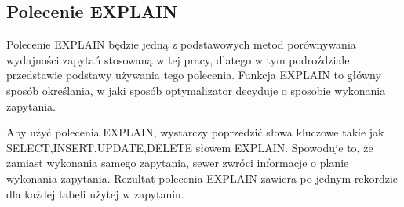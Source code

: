 \subsection{Polecenie EXPLAIN}
Polecenie EXPLAIN będzie jedną z podstawowych metod porównywania wydajności zapytań stosowaną w tej pracy, dlatego w tym podroździale przedstawie podstawy używania tego polecenia. Funkcja EXPLAIN to główny sposób określania, w jaki sposób optymalizator decyduje o sposobie wykonania zapytania.

Aby użyć polecenia EXPLAIN, wystarczy poprzedzić słowa kluczowe takie jak SELECT,INSERT,UPDATE,DELETE słowem EXPLAIN. Spowoduje to, że zamiast wykonania samego zapytania, sewer zwróci informacje o planie wykonania zapytania. Rezultat polecenia EXPLAIN zawiera po jednym rekordzie dla każdej tabeli użytej w zapytaniu. 

